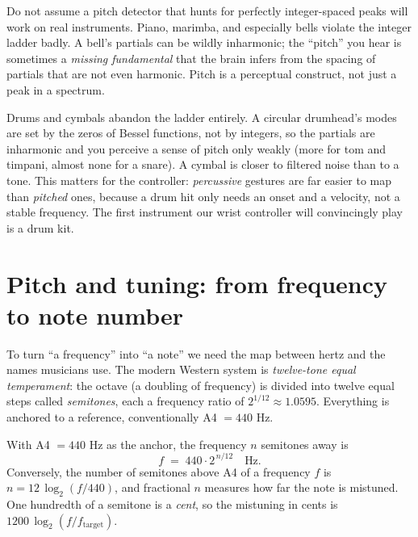 \begin{trapbox}
Do not assume a pitch detector that hunts for perfectly integer-spaced peaks will work on real
instruments. Piano, marimba, and especially bells violate the integer ladder badly. A bell's partials
can be wildly inharmonic; the ``pitch'' you hear is sometimes a \emph{missing fundamental} that the
brain infers from the spacing of partials that are not even harmonic. Pitch is a perceptual construct,
not just a peak in a spectrum.
\end{trapbox}

\begin{applicationbox}
Drums and cymbals abandon the ladder entirely. A circular drumhead's modes are set by the zeros of
Bessel functions, not by integers, so the partials are inharmonic and you perceive a sense of pitch
only weakly (more for tom and timpani, almost none for a snare). A cymbal is closer to filtered noise
than to a tone. This matters for the controller: \emph{percussive} gestures are far easier to map
than \emph{pitched} ones, because a drum hit only needs an onset and a velocity, not a stable
frequency. The first instrument our wrist controller will convincingly play is a drum kit.
\end{applicationbox}

\section{Pitch and tuning: from frequency to note number}
\label{ch29:pitch-tuning}

To turn ``a frequency'' into ``a note'' we need the map between hertz and the names musicians use. The
modern Western system is \emph{twelve-tone equal temperament}: the octave (a doubling of frequency)
is divided into twelve equal steps called \emph{semitones}, each a frequency ratio of $2^{1/12}
\approx 1.0595$. Everything is anchored to a reference, conventionally A4 $= 440$ Hz.

\begin{definition}
\label{ch29:def-et}
With A4 $= 440$ Hz as the anchor, the frequency $n$ semitones away is
\[
  f \;=\; 440 \cdot 2^{\,n/12} \quad\text{Hz}.
\]
Conversely, the number of semitones above A4 of a frequency $f$ is $n = 12\,\log_2(f/440)$, and
fractional $n$ measures how far the note is mistuned. One hundredth of a semitone is a \emph{cent}, so
the mistuning in cents is $1200\,\log_2(f/f_{\text{target}})$.
\end{definition}

